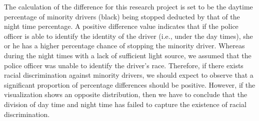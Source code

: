 \documentclass[
]{book}
\begin{document}
The calculation of the difference for this research project is set to be the daytime percentage of minority drivers (black) being stopped deducted by that of the night time percentage. A positive difference value indicates that if the police officer is able to identify the identity of the driver (i.e., under the day times), she or he has a higher percentage chance of stopping the minority driver. Whereas during the night times with a lack of sufficient light source, we assumed that the police officer was unable to identify the driver's race. Therefore, if there exists racial discrimination against minority drivers, we should expect to observe that a significant proportion of percentage differences should be positive. However, if the visualization shows an opposite distribution, then we have to conclude that the division of day time and night time has failed to capture the existence of racial discrimination.
\end{document}
